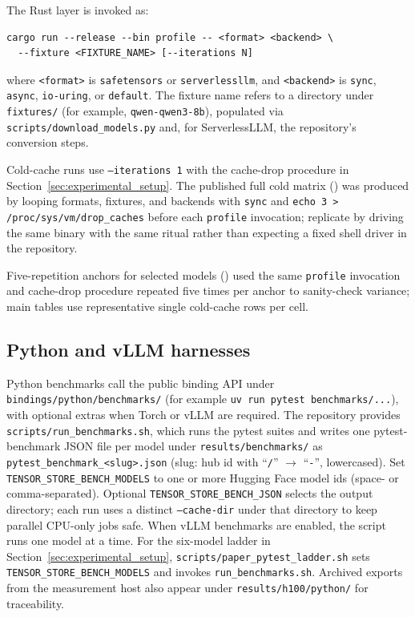 The Rust layer is invoked as:

\begin{verbatim}
cargo run --release --bin profile -- <format> <backend> \
  --fixture <FIXTURE_NAME> [--iterations N]
\end{verbatim}

\noindent where \texttt{<format>} is \texttt{safetensors} or \texttt{serverlessllm}, and \texttt{<backend>} is \texttt{sync}, \texttt{async}, \texttt{io-uring}, or \texttt{default}. The fixture name refers to a directory under \texttt{fixtures/} (for example, \texttt{qwen-qwen3-8b}), populated via \texttt{scripts/download\_models.py} and, for ServerlessLLM, the repository's conversion steps.

Cold-cache runs use \texttt{--iterations 1} with the cache-drop procedure in Section~\ref{sec:experimental_setup}. The published full cold matrix () was produced by looping formats, fixtures, and backends with \texttt{sync} and \texttt{echo 3 > /proc/sys/vm/drop\_caches} before each \texttt{profile} invocation; replicate by driving the same binary with the same ritual rather than expecting a fixed shell driver in the repository.

Five-repetition anchors for selected models () used the same \texttt{profile} invocation and cache-drop procedure repeated five times per anchor to sanity-check variance; main tables use representative single cold-cache rows per cell.

\subsection{Python and vLLM harnesses}

Python benchmarks call the public binding API under \texttt{bindings/python/benchmarks/} (for example \texttt{uv run pytest benchmarks/...}), with optional extras when Torch or vLLM are required. The repository provides \texttt{scripts/run\_benchmarks.sh}, which runs the pytest suites and writes one pytest-benchmark JSON file per model under \texttt{results/benchmarks/} as \texttt{pytest\_benchmark\_<slug>.json} (slug: hub id with ``\texttt{/}'' $\rightarrow$ ``\texttt{-}'', lowercased). Set \texttt{TENSOR\_STORE\_BENCH\_MODELS} to one or more Hugging Face model ids (space- or comma-separated). Optional \texttt{TENSOR\_STORE\_BENCH\_JSON} selects the output directory; each run uses a distinct \texttt{--cache-dir} under that directory to keep parallel CPU-only jobs safe. When vLLM benchmarks are enabled, the script runs one model at a time. For the six-model ladder in Section~\ref{sec:experimental_setup}, \texttt{scripts/paper\_pytest\_ladder.sh} sets \texttt{TENSOR\_STORE\_BENCH\_MODELS} and invokes \texttt{run\_benchmarks.sh}. Archived exports from the measurement host also appear under \texttt{results/h100/python/} for traceability.

